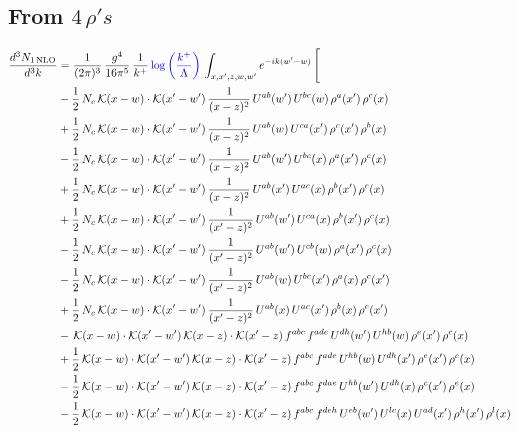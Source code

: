 \documentclass[9pt]{article}
\numberwithin{equation}{section}
\begin{document}
\subsection{From $4\, \rho's$}
\begin{align}
\frac{d^{3}N_{1\,\mathrm{NLO}}}{d^{3}k} & = \frac{1}{(2\pi)^{3}}\,\frac{g^{4}}{16\pi^{5}}\,\frac{1}{k^{+}}\,{\color{blue}\log{\left(\frac{k^{+}}{\Lambda}\right)}}\,\int_{x,x',z,w,w'}e^{-ik(w'-w)}\,\Bigg[\notag\\ & -\frac{1}{2}\,N_{c}\,\mathcal{K}(x-w)\cdot\mathcal{K}(x'-w')\,\frac{1}{(x-z)^{2}}\,U^{ab}(w')\,U^{bc}(w)\,\rho^{a}(x')\,\rho^{c}(x)\notag\\
& +\frac{1}{2}\,N_{c}\,\mathcal{K}(x-w)\cdot\mathcal{K}(x'-w')\,\frac{1}{(x-z)^{2}}\,U^{ab}(w)\,U^{ca}(x')\,\rho^{c}(x')\,\rho^{b}(x)\notag\\
& -\frac{1}{2}\,N_{c}\,\mathcal{K}(x-w)\cdot\mathcal{K}(x'-w')\,\frac{1}{(x-z)^{2}}\,U^{ab}(w')\,U^{bc}(x)\,\rho^{a}(x')\,\rho^{c}(x)\notag\\
& +\frac{1}{2}\,N_{c}\,\mathcal{K}(x-w)\cdot\mathcal{K}(x'-w')\,\frac{1}{(x-z)^{2}}\,U^{ab}(x')\,U^{ac}(x)\,\rho^{b}(x')\,\rho^{c}(x)\notag\\
& +\frac{1}{2}\,N_{c}\,\mathcal{K}(x-w)\cdot\mathcal{K}(x'-w')\,\frac{1}{(x'-z)^{2}}\,U^{ab}(w')\,U^{ca}(x)\,\rho^{b}(x')\,\rho^{c}(x)\notag\\
& -\frac{1}{2}\,N_{c}\,\mathcal{K}(x-w)\cdot\mathcal{K}(x'-w')\,\frac{1}{(x'-z)^{2}}\,U^{ab}(w')\,U^{cb}(w)\,\rho^{a}(x')\,\rho^{c}(x)\notag\\
& -\frac{1}{2}\,N_{c}\,\mathcal{K}(x-w)\cdot\mathcal{K}(x'-w')\,\frac{1}{(x'-z)^{2}}\,U^{ab}(w)\,U^{bc}(x')\,\rho^{a}(x)\,\rho^{c}(x')\notag\\
& +\frac{1}{2}\,N_{c}\,\mathcal{K}(x-w)\cdot\mathcal{K}(x'-w')\,\frac{1}{(x'-z)^{2}}\,U^{ab}(x)\,U^{ac}(x')\,\rho^{b}(x)\,\rho^{c}(x')\notag\\
& -\,\mathcal{K}(x-w)\cdot\mathcal{K}(x'-w')\,\mathcal{K}(x-z)\cdot\mathcal{K}(x'-z)\,f^{abc}\,f^{ade}\,U^{dh}(w')\,U^{hb}(w)\,\rho^{e}(x')\,\rho^{c}(x)\notag\\
& +\frac{1}{2}\,\mathcal{K}(x-w)\cdot\mathcal{K}(x'-w')\,\mathcal{K}(x-z)\cdot\mathcal{K}(x'-z)\,f^{abc}\,f^{ade}\,U^{hb}(w)\,U^{dh}(x')\,\rho^{e}(x')\,\rho^{c}(x)\notag\\
& -\frac{1}{2}\,\mathcal{K}(x-w)\cdot\mathcal{K}(x'-w')\,\mathcal{K}(x-z)\cdot\mathcal{K}(x'-z)\,f^{abc}\,f^{dae}\,U^{hb}(w')\,U^{dh}(x)\,\rho^{c}(x')\,\rho^{e}(x)\notag\\
& -\frac{1}{2}\,\mathcal{K}(x-w)\cdot\mathcal{K}(x'-w')\,\mathcal{K}(x-z)\cdot\mathcal{K}(x'-z)\,f^{abc}\,f^{deh}\,U^{eb}(w')\,U^{lc}(x)\,U^{ad}(x')\,\rho^{h}(x')\,\rho^{l}(x)\notag\\

\end{align}
\end{document}
